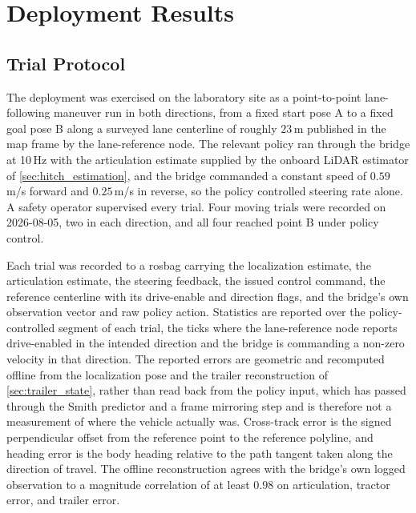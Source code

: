 \begin{figure}[H]
  \centering
  \label{fig:sensor_nodes}
\end{figure}

\section{Deployment Results}
\label{sec:deployment_results}

\subsection{Trial Protocol}
\label{sec:deployment_protocol}

The deployment was exercised on the laboratory site as a point-to-point lane-following maneuver run in both directions, from a fixed start pose A to a fixed goal pose B along a surveyed lane centerline of roughly $23$\,m published in the map frame by the lane-reference node. The relevant policy ran through the bridge at 10\,Hz with the articulation estimate supplied by the onboard LiDAR estimator of \cref{sec:hitch_estimation}, and the bridge commanded a constant speed of $0.59$\,m/s forward and $0.25$\,m/s in reverse, so the policy controlled steering rate alone. A safety operator supervised every trial. Four moving trials were recorded on 2026-08-05, two in each direction, and all four reached point B under policy control.

Each trial was recorded to a rosbag carrying the localization estimate, the articulation estimate, the steering feedback, the issued control command, the reference centerline with its drive-enable and direction flags, and the bridge's own observation vector and raw policy action. Statistics are reported over the policy-controlled segment of each trial, the ticks where the lane-reference node reports drive-enabled in the intended direction and the bridge is commanding a non-zero velocity in that direction. The reported errors are geometric and recomputed offline from the localization pose and the trailer reconstruction of \cref{sec:trailer_state}, rather than read back from the policy input, which has passed through the Smith predictor and a frame mirroring step and is therefore not a measurement of where the vehicle actually was. Cross-track error is the signed perpendicular offset from the reference point to the reference polyline, and heading error is the body heading relative to the path tangent taken along the direction of travel. The offline reconstruction agrees with the bridge's own logged observation to a magnitude correlation of at least $0.98$ on articulation, tractor error, and trailer error.

